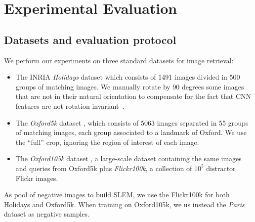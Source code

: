 \section{Experimental Evaluation}
\label{eval}


\subsection{Datasets and evaluation protocol} \label{eval:protocol}
We perform our experiments on three standard datasets for image retrieval: 
\begin{itemize}
    \item The INRIA \emph{Holidays} dataset \cite{holidays} which consists of 1491 images divided in 500 groups of matching images. We manually rotate by 90 degrees some images that are not in their natural orientation to compensate for the fact that CNN features are not rotation invariant~\cite{babenko14,Arandjelovic15,RaToCh16}.
    \item The \emph{Oxford5k} dataset \cite{oxford}, which consists of 5063 images separated in 55 groups of matching images, each group associated to a landmark of Oxford. We use the ``full'' crop, ignoring the region of interest of each image.
    \item The \emph{Oxford105k} dataset \cite{oxford}, a large-scale dataset containing the same images and queries from Oxford5k plus \emph{Flickr100k}, a collection of $10^5$ distractor Flickr images.
\end{itemize}
As pool of negative images to build SLEM, we use the Flickr100k for both Holidays and Oxford5k. When training on Oxford105k, we us instead the \emph{Paris} dataset \cite{PhiChIsSiZi08} as negative samples. 

